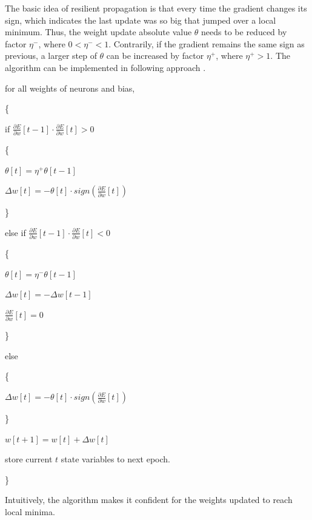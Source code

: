 \documentclass[procedia]{easychair}
\begin{document}
The basic idea of resilient propagation is that every time the gradient changes its sign, which indicates the last update was so big that jumped over a local minimum.  Thus, the weight update absolute value $\theta$ needs to be reduced by factor $\eta ^ -$, where $0 < \eta ^ - < 1$.  Contrarily, if the gradient remains the same sign as previous, a larger step of $\theta$ can be increased by factor $\eta ^ +$, where $\eta ^ + > 1$.  The algorithm can be implemented in following approach \cite{riedmiller1993direct}.
\newline

\indent
for all weights of neurons and bias,

\indent
\{

\indent \indent
if \( \frac{ \partial E }{ \partial w } [ t - 1 ] \cdot \frac{ \partial E }{ \partial w } [t] > 0 \)

\indent \indent
\{

\indent \indent \indent
\( \theta[t] = \eta ^ + \theta[ t - 1 ] \)

\indent \indent \indent
\( \Delta w[t] = - \theta[t] \cdot sign \left( \frac{ \partial E }{ \partial w } [t] \right) \)

\indent \indent
\}

\indent \indent
else if \( \frac{ \partial E }{ \partial w } [ t - 1 ] \cdot \frac{ \partial E }{ \partial w } [t] < 0 \)

\indent \indent
\{

\indent \indent \indent
\( \theta[t] = \eta ^ - \theta[ t - 1 ] \)

\indent \indent \indent
\( \Delta w[t] = - \Delta w[ t - 1 ] \)

\indent \indent \indent
\( \frac{ \partial E }{ \partial w } [t] = 0 \)

\indent \indent
\}

\indent \indent
else

\indent \indent
\{

\indent \indent \indent
\( \Delta w[t] = - \theta[t] \cdot sign \left( \frac{ \partial E }{ \partial w } [t] \right) \)

\indent \indent
\}


\indent \indent
\( w[ t + 1 ] = w[t] + \Delta w[t] \)

\indent \indent
store current \(t\) state variables to next epoch.

\indent
\}
\newline

Intuitively, the algorithm makes it confident for the weights updated to reach local minima.
\end{document}
